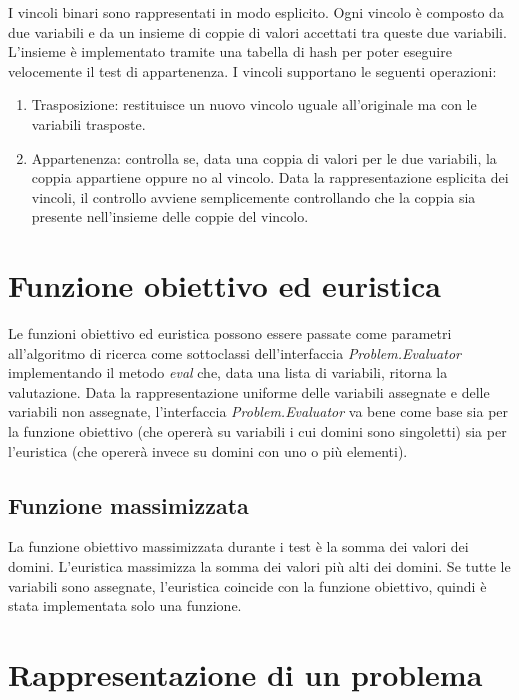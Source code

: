 \documentclass[a4paper,12pt,italian]{article}
\begin{document}
I vincoli binari sono rappresentati in modo esplicito. Ogni vincolo
\`e composto da due variabili e da un insieme di coppie di valori
accettati tra queste due variabili. L'insieme \`e implementato
tramite una tabella di hash per poter eseguire velocemente il test di
appartenenza. I vincoli supportano le seguenti
operazioni:

\begin{enumerate}
\item Trasposizione: restituisce un nuovo vincolo uguale all'originale
  ma con le variabili trasposte.
\item Appartenenza: controlla se, data una coppia di valori per le due variabili, la
  coppia appartiene oppure no al vincolo. Data la rappresentazione
  esplicita dei vincoli, il controllo avviene semplicemente
  controllando che la coppia sia presente nell'insieme delle coppie
  del vincolo.
\end{enumerate}

\section{Funzione obiettivo ed euristica}

Le funzioni obiettivo ed euristica possono essere passate come
parametri all'algoritmo di ricerca come sottoclassi dell'interfaccia
\textit{Problem.Evaluator} implementando il metodo \textit{eval} che,
data una lista di variabili, ritorna la valutazione. Data la
rappresentazione uniforme delle variabili assegnate e delle variabili
non assegnate, l'interfaccia \textit{Problem.Evaluator} va bene come
base sia per la funzione obiettivo (che operer\`a su variabili i cui
domini sono singoletti) sia per l'euristica (che operer\`a invece su
domini con uno o pi\`u elementi).

\subsection{Funzione massimizzata}

La funzione obiettivo massimizzata durante i test \`e la somma dei
valori dei domini. L'euristica massimizza la somma dei valori pi\`u
alti dei domini. Se tutte le variabili sono assegnate, l'euristica
coincide con la funzione obiettivo, quindi \`e stata implementata solo
una funzione.

\section{Rappresentazione di un problema}
\end{document}

